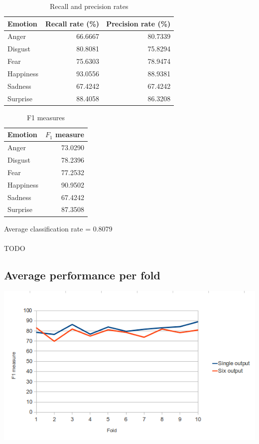 \documentclass[12pt]{article}
\begin{document}
\begin{table}
\centering
\begin{tabular}{l | r r}
Emotion & Recall rate (\%) & Precision rate (\%) \\
\hline
Anger     & 66.6667 & 80.7339 \\
Disgust   & 80.8081 & 75.8294 \\
Fear      & 75.6303 & 78.9474 \\
Happiness & 93.0556 & 88.9381 \\
Sadness   & 67.4242 & 67.4242 \\
Surprise  & 88.4058 & 86.3208 \\
\end{tabular}
\caption{Recall and precision rates}
\end{table}

\begin{table}
\centering
\begin{tabular}{l | r}
Emotion & \( F_1 \) measure \\
\hline
Anger     & 73.0290 \\
Disgust   & 78.2396 \\
Fear      & 77.2532 \\
Happiness & 90.9502 \\
Sadness   & 67.4242 \\
Surprise  & 87.3508 \\
\end{tabular}
\caption{F1 measures}
\end{table}

Average classification rate = 0.8079 \\ \\

TODO


\subsection*{Average performance per fold}

\begin{center}
  \includegraphics[scale=0.7]{report-images/graph.png}
\end{center}
\end{document}
